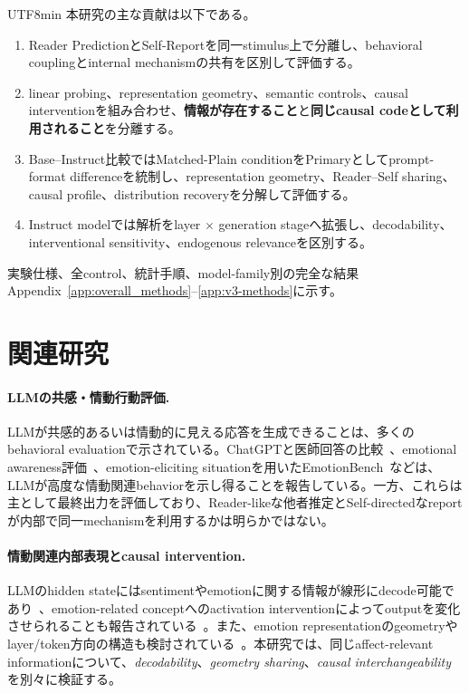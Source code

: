 \documentclass{article} %
\begin{document}
\begin{CJK*}{UTF8}{min}
本研究の主な貢献は以下である。
\begin{enumerate}
    \item Reader PredictionとSelf-Reportを同一stimulus上で分離し、behavioral couplingとinternal mechanismの共有を区別して評価する。
    \item linear probing、representation geometry、semantic controls、causal interventionを組み合わせ、\textbf{情報が存在すること}と\textbf{同じcausal codeとして利用されること}を分離する。
    \item Base--Instruct比較ではMatched-Plain conditionをPrimaryとしてprompt-format differenceを統制し、representation geometry、Reader--Self sharing、causal profile、distribution recoveryを分解して評価する。
    \item Instruct modelでは解析をlayer $\times$ generation stageへ拡張し、decodability、interventional sensitivity、endogenous relevanceを区別する。
\end{enumerate}

実験仕様、全control、統計手順、model-family別の完全な結果Appendix~\ref{app:overall_methods}--\ref{app:v3-methods}に示す。


\section{関連研究}
\label{sec:related-work-main}

\paragraph{LLMの共感・情動行動評価.}
LLMが共感的あるいは情動的に見える応答を生成できることは、多くのbehavioral evaluationで示されている。ChatGPTと医師回答の比較~\citep{ayers2023comparing}、emotional awareness評価~\citep{elyoseph2023chatgpt}、emotion-eliciting situationを用いたEmotionBench~\citep{huang2023emotionally}などは、LLMが高度な情動関連behaviorを示し得ることを報告している。一方、これらは主として最終出力を評価しており、Reader-likeな他者推定とSelf-directedなreportが内部で同一mechanismを利用するかは明らかではない。

\paragraph{情動関連内部表現とcausal intervention.}
LLMのhidden stateにはsentimentやemotionに関する情報が線形にdecode可能であり~\citep{di2025llamas}、emotion-related conceptへのactivation interventionによってoutputを変化させられることも報告されている~\citep{tak2025mechanistic,banayeeanzade2026psychological}。また、emotion representationのgeometryやlayer/token方向の構造も検討されている~\citep{zhang2025decoding,reichman2026emotions,wu2026decoding}。本研究では、同じaffect-relevant informationについて、\textit{decodability}、\textit{geometry sharing}、\textit{causal interchangeability}を別々に検証する。


\end{CJK*}
\end{document}
